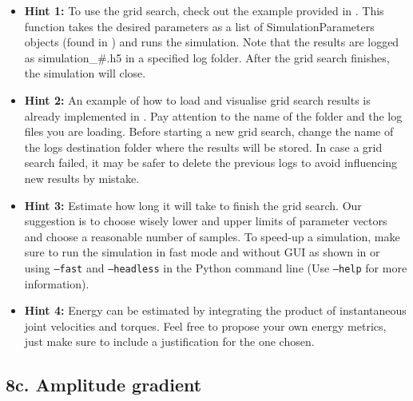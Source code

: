 \documentclass{cmc}
\begin{document}
\begin{itemize}
\item \textbf{Hint 1:} To use the grid search, check out the example provided in
  . This function takes the desired parameters as a
  list of SimulationParameters objects (found in
  ) and runs the simulation. Note that the
  results are logged as simulation\_\#.h5 in a specified log folder. After the
  grid search finishes, the simulation will close.
\item \textbf{Hint 2:} An example of how to load and visualise grid search
  results is already implemented in . Pay
  attention to the name of the folder and the log files you are loading. Before
  starting a new grid search, change the name of the logs destination folder
  where the results will be stored. In case a grid search failed, it may be
  safer to delete the previous logs to avoid influencing new results by mistake.
\item \textbf{Hint 3:} Estimate how long it will take to finish the grid
  search. Our suggestion is to choose wisely lower and upper limits of parameter
  vectors and choose a reasonable number of samples. To speed-up a simulation,
  make sure to run the simulation in fast mode and without GUI as shown in
   or using \texttt{--fast} and \texttt{--headless}
  in the Python command line (Use \texttt{--help} for more information).
\item \textbf{Hint 4:} Energy can be estimated by integrating the product of
  instantaneous joint velocities and torques. Feel free to propose your own
  energy metrics, just make sure to include a justification for the one chosen.
\end{itemize}



\subsection*{8c. Amplitude gradient}
\label{sec:amplitude-gradient}
\end{document}
